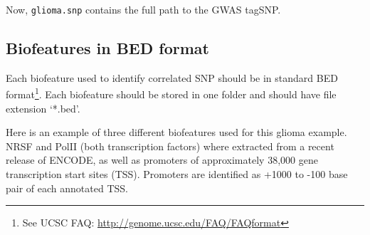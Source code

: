 \documentclass[12pt,fullpage]{article}
\newcommand{\Robject}[1]{{\texttt{#1}}}
\begin{document}
Now, \Robject{glioma.snp} contains the full path to the GWAS tagSNP. 

\subsection{Biofeatures in BED format}

Each biofeature used to identify correlated SNP should be in standard BED
format\footnote{See UCSC FAQ: \url{http://genome.ucsc.edu/FAQ/FAQformat}}. Each
biofeature should be stored in one folder and should have file extension
`*.bed'.

Here is an example of three different biofeatures used for this glioma example.
NRSF and PolII (both transcription factors) where extracted from a recent
release of ENCODE, as well as promoters of approximately 38,000 gene
transcription start sites (TSS). Promoters are identified as +1000 to -100 base
pair of each annotated TSS.
\end{document}

